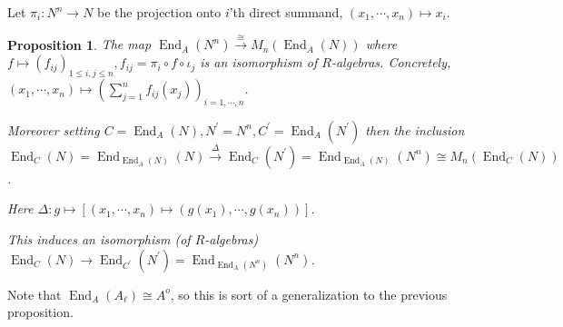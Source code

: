 \documentclass{article}
\theoremstyle{definition}
\theoremstyle{plain}
\newtheorem{proposition}[theorem]{Proposition}
\theoremstyle{remark}
\begin{document}
    Let \(\pi_i : N^n \to N\) be the projection onto \(i\)'th direct summand, \((x_1 , \cdots , x_n) \mapsto x_i\).  

    \begin{proposition}
        The map \(\operatorname{End}_A(N^n) \xrightarrow{\cong} M_n(\operatorname{End}_A(N))\) where \(f \mapsto (f_{ij})_{1 \leq i,j \leq n}, f_{ij} = \pi_i \circ f \circ \iota_j\) is an isomorphism of \(R\)-algebras. Concretely, \((x_1 , \cdots , x_n) \mapsto \left(\sum_{j=1}^n f_{ij}(x_j) \right)_{i=1,\cdots ,n}\).

        Moreover setting \(C = \operatorname{End}_A(N), N^{\prime} = N^n, C^{\prime} = \operatorname{End}_A(N^{\prime})\) then the inclusion \(\operatorname{End}_C(N) = \operatorname{End}_{\operatorname{End}_A(N)}(N) \xrightarrow{\Delta} \operatorname{End}_C(N^{\prime}) = \operatorname{End}_{\operatorname{End}_A(N)}(N^n) \cong M_n(\operatorname{End}_C(N))\).

        Here \(\Delta : g \mapsto [(x_1 , \cdots , x_n) \mapsto (g(x_1), \cdots , g(x_n))]\).

        This induces an isomorphism (of \(R\)-algebras) \(\operatorname{End}_C(N) \to \operatorname{End}_{C^{\prime}}(N^{\prime}) = \operatorname{End}_{\operatorname{End}_A(N^n)}(N^n)\). 
    \end{proposition}

    Note that \(\operatorname{End}_A(A_\ell) \cong A^o\), so this is sort of a generalization to the previous proposition. 
\end{document}
